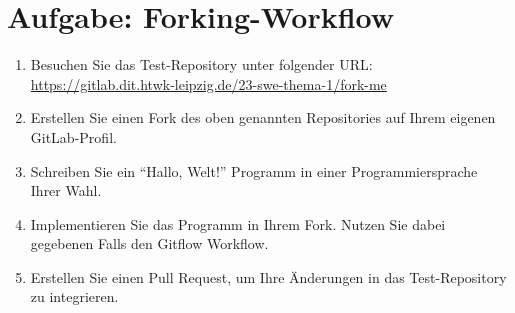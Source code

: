 
\section{Aufgabe: Forking\hyp Workflow}
\label{sec:task:forking}


\begin{enumerate}
    \item Besuchen Sie das Test\hyp Repository unter folgender URL: \url{https://gitlab.dit.htwk-leipzig.de/23-swe-thema-1/fork-me}
    
    \item Erstellen Sie einen Fork des oben genannten Repositories auf Ihrem eigenen GitLab\hyp Profil.
  
    \item Schreiben Sie ein \enquote{Hallo, Welt!} Programm in einer Programmiersprache Ihrer Wahl.
  
    \item Implementieren Sie das Programm in Ihrem Fork. Nutzen Sie dabei gegebenen Falls den Gitflow Workflow.
  
    \item Erstellen Sie einen Pull Request, um Ihre Änderungen in das Test\hyp Repository zu integrieren.
  
  \end{enumerate}
